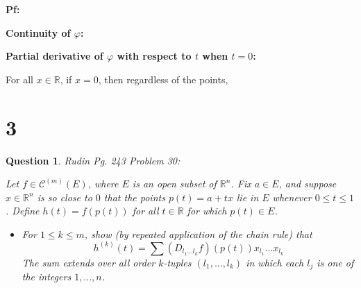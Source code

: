\documentclass{article}
\newtheorem{question}{Question}
\begin{document}
\textbf{Pf:}

\textbf{Continuity of $\varphi$:}

\hfil

\textbf{Partial derivative of $\varphi$ with respect to $t$ when $t=0$:}

For all $x\in\mathbb{R}$, if $x=0$, then regardless of the points, 

\break

\section*{3}
\begin{myBox}[]{}
    \begin{question}
        Rudin Pg. 243 Problem 30:

        Let $f\in \mathcal{C}^{(m)}(E)$, where $E$ is an open subset of $\mathbb{R}^n$. Fix $a\in E$, and suppose $x\in\mathbb{R}^n$ is so close to $0$ that the points $p(t)=a+tx$ lie in $E$ whenever $0\leq t\leq 1$. Define $h(t)=f(p(t))$ for all $t\in\mathbb{R}$ for which $p(t)\in E$.
        \begin{itemize}
            \item[(a)] For $1\leq k\leq m$, show (by repeated application of the chain rule) that 
            $$h^{(k)}(t)=\sum (D_{l_1...l_k}f)(p(t))x_{l_1}...x_{l_k}$$
            The sum extends over all order $k$-tuples $(l_1,...,l_k)$ in which each $l_j$ is one of the integers $1,...,n$.
            \begin{comment}
            \item[(b)] By Taylor's Theorem:
            $$h(1)=\sum_{k=0}^{m-1}\frac{h^{(k)}(0)}{k!}+\frac{h^{(m)}(t)}{m!}$$
            for some $t\in (0,1)$. Use this to prove Taylor's Theorem in $n$ variables by showing that the formula 
            $$f(a+x)=\sum_{k=0}^{m-1}\frac{1}{k!}\left(\sum(D_{l_1...l_k}f)(a)x_{l_1}...x_{l_k}\right)+r(x)$$
            represents $f(a+x)$ as the sum of its so-called "Taylor polynomial of degree $m-1$" plus a remainder that satisfies 
            $$\lim_{x\rightarrow 0}\frac{r(x)}{|x|^{m-1}}=0$$
            Each of the inner sums extends over all ordered $k$-tuples $(l_1,...,l_k)$, as in part (a); as usual, the zero-order derivative of $f$ is simply $f$, so that the constant term of the Taylor polynomial of $f$ at $a$ is $f(a)$.
            \item[(c)] Exercise $29$ shows that repetition occurs in the Taylor polynomial as written in part (b). For instance, $D_{113}$ occurs three times, as $D_{113}, D_{131}, D_{311}$. The sum of the corresponding three terms can be written in the form 
            $$3(D_1^2D_3f)(a)x_1^2x_3$$
            Prove (by calculating how often each derivative occurs) that the Taylor polynomial in (b) can be written in the form 
            $$\sum\frac{(D_1^{s_1}...D_n^{s_n}f)(a)}{s_1!...s_n!}x_1^{s_1}...x_n^{s_n}$$
            Here the summation extends over all ordered $n$-tuples $(s_1,...,s_n)$ such that each $s_i$ is a nonnegative integer and $s_1+...+s_n\leq m-1$.
            \end{comment}
        \end{itemize}
    \end{question}
\end{myBox}
\end{document}
